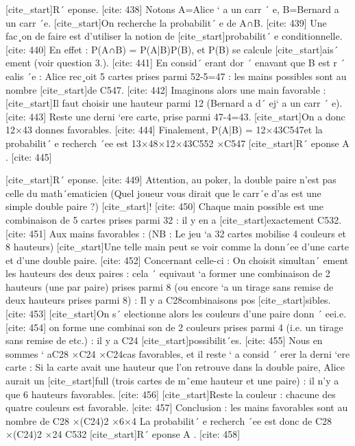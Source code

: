 [cite_start]R´ eponse. [cite: 438]
Notons A=Alice ` a un carr ´ e, B=Bernard a un carr ´e.
 [cite_start]On recherche la probabilit´ e de A∩B. [cite: 439]
Une fac¸on de faire est d’utiliser la notion de
 [cite_start]probabilit´ e conditionnelle. [cite: 440]
En effet : P(A∩B) = P(A|B)P(B), et P(B) se calcule
 [cite_start]ais´ ement (voir question 3.). [cite: 441]
En consid´ erant dor ´ enavant que B est r ´ ealis ´e : 
 Alice rec¸oit 5 cartes prises parmi 52-5=47 : les mains possibles sont au nombre
 [cite_start]de C547. [cite: 442]
Imaginons alors une main favorable :
 [cite_start]Il faut choisir une hauteur parmi 12 (Bernard a d´ ej` a un carr ´ e). [cite: 443]
Reste une derni `ere 
 carte, prise parmi 47-4=43. [cite_start]On a donc 12×43 donnes favorables. [cite: 444]
Finalement, P(A|B) = 12×43C547et la probabilit´ e recherch ´ee est 13×48×12×43C552 ×C547
 [cite_start]R´ eponse A . [cite: 445]

[cite_start]R´ eponse. [cite: 449]
Attention, au poker, la double paire n’est pas celle du math´ematicien 
 (Quel joueur vous dirait que le carr´e d’as est une simple double paire ?) [cite_start]! [cite: 450]
Chaque main possible est une combinaison de 5 cartes prises parmi 32 : il y en a
 [cite_start]exactement C532. [cite: 451]
Aux mains favorables :
 (NB : Le jeu `a 32 cartes mobilise 4 couleurs et 8 hauteurs) 
 [cite_start]Une telle main peut se voir comme la donn´ee d’une carte et d’une double paire. [cite: 452]
Concernant celle-ci :
 On choisit simultan´ ement les hauteurs des deux paires : cela ´ equivaut `a former 
 une combinaison de 2 hauteurs (une par paire) prises parmi 8 (ou encore `a un 
 tirage sans remise de deux hauteurs prises parmi 8) : Il y a C28combinaisons pos 
 [cite_start]sibles. [cite: 453]
[cite_start]On s´ electionne alors les couleurs d’une paire donn ´ eei.e. [cite: 454]
on forme une combinai 
 son de 2 couleurs prises parmi 4 (i.e. un tirage sans remise de etc.) : il y a C24
 [cite_start]possibilit´es. [cite: 455]
Nous en sommes ` aC28 ×C24 ×C24cas favorables, et il reste ` a consid ´ erer la derni `ere 
 carte :
 Si la carte avait une hauteur que l’on retrouve dans la double paire, Alice aurait un
 [cite_start]full (trois cartes de mˆeme hauteur et une paire) : il n’y a que 6 hauteurs favorables. [cite: 456]
[cite_start]Reste la couleur : chacune des quatre couleurs est favorable. [cite: 457]
Conclusion : les mains favorables sont au nombre de
 C28 ×(C24)2 ×6×4
 La probabilit´ e recherch ´ee est donc de 
 C28 ×(C24)2 ×24
 C532
 [cite_start]R´ eponse A . [cite: 458]

